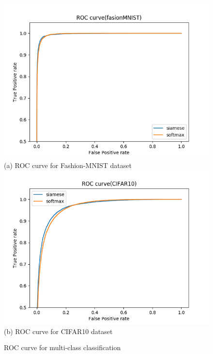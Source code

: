 \documentclass[runningheads,a4paper]{llncs}
\begin{document}
\begin{figure}[t]
\centering
            \centering
            \includegraphics[scale=0.7]{fasion_multiroccurve.png}
           \\ (a) ROC curve for Fashion-MNIST dataset\\
            \centering
            \includegraphics[scale=0.7]{multiroc_curve.png}
            \\ (b) ROC curve for CIFAR10 dataset\\
\caption{ROC curve for multi-class classification}
\label{fig:roc-mul}
\end{figure}
\end{document}
